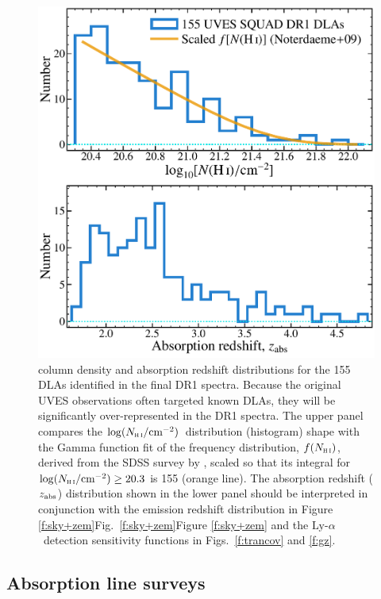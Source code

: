 \documentclass[fleqn,usenatbib,usedcolumn]{mnras}
\newcommand{\Fref}[1]{\ifhmode \ifnum\spacefactor=1001 Figure \ref{#1}\else Fig.\ \ref{#1}\fi \else Figure \ref{#1}\fi}
\newcommand{\lya}{\ensuremath{\textrm{Ly-}\alpha}}
\newcommand{\zab}{\ensuremath{z_\textrm{\scriptsize abs}}}
\newcommand{\NHI}{\ensuremath{N_\textsc{h\scriptsize{\,i}}}}
\newcommand{\lNHI}{\ensuremath{\log(N_\textsc{h\scriptsize{\,i}}/\textrm{cm}^{-2})}}
\begin{document}
\begin{figure}
\begin{center}
\includegraphics[width=0.90\columnwidth]{DR1_DLAdists.pdf}
\vspace{-1em}
\caption{ column density and absorption redshift distributions for the 155 DLAs identified in the final DR1 spectra. Because the original UVES observations often targeted known DLAs, they will be significantly over-represented in the DR1 spectra. The upper panel compares the \lNHI\ distribution (histogram) shape with the Gamma function fit of the frequency distribution, $f(\NHI)$, derived from the SDSS survey by \citet{Noterdaeme:2009:1087}, scaled so that its integral for $\lNHI\ge20.3$ is 155 (orange line). The absorption redshift (\zab) distribution shown in the lower panel should be interpreted in conjunction with the emission redshift distribution in \Fref{f:sky+zem} and the \lya\ detection sensitivity functions in Figs.\ \ref{f:trancov} and \ref{f:gz}.}
\label{f:DLAdists}
\end{center}
\end{figure}


\subsection{Absorption line surveys}\label{ss:surveys}
\end{document}
